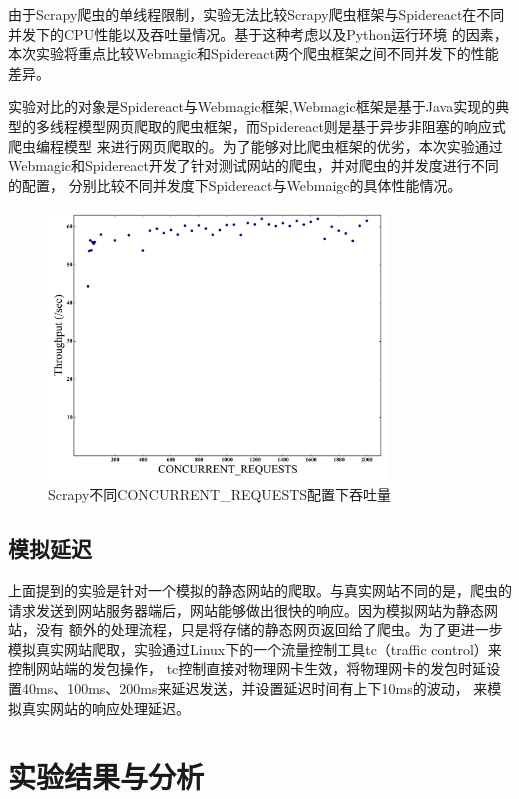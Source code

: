 \documentclass[master]{njuthesis}
\begin{document}
由于Scrapy爬虫的单线程限制，实验无法比较Scrapy爬虫框架与Spidereact在不同并发下的CPU性能以及吞吐量情况。基于这种考虑以及Python运行环境
的因素，本次实验将重点比较Webmagic和Spidereact两个爬虫框架之间不同并发下的性能差异。

实验对比的对象是Spidereact与Webmagic框架,Webmagic框架是基于Java实现的典型的多线程模型网页爬取的爬虫框架，而Spidereact则是基于异步非阻塞的响应式爬虫编程模型
来进行网页爬取的。为了能够对比爬虫框架的优劣，本次实验通过Webmagic和Spidereact开发了针对测试网站的爬虫，并对爬虫的并发度进行不同的配置，
分别比较不同并发度下Spidereact与Webmaigc的具体性能情况。

\begin{figure}
\centering
\includegraphics[width=0.8\textwidth]{pic/scrapy.png}

\caption{Scrapy不同CONCURRENT\_REQUESTS配置下吞吐量}\label{scrapy}
\end{figure}

\subsection{模拟延迟}
上面提到的实验是针对一个模拟的静态网站的爬取。与真实网站不同的是，爬虫的请求发送到网站服务器端后，网站能够做出很快的响应。因为模拟网站为静态网站，没有
额外的处理流程，只是将存储的静态网页返回给了爬虫。为了更进一步模拟真实网站爬取，实验通过Linux下的一个流量控制工具tc（traffic control）来控制网站端的发包操作，
tc控制直接对物理网卡生效，将物理网卡的发包时延设置40ms、100ms、200ms来延迟发送，并设置延迟时间有上下10ms的波动，
来模拟真实网站的响应处理延迟。


\section{实验结果与分析}
\end{document}
